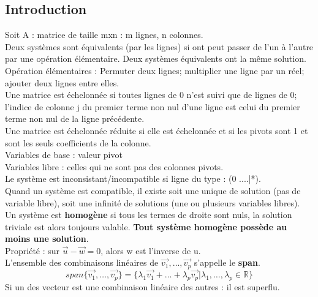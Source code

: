 \documentclass[../main.tex]{subfiles}
\begin{document}
\localtableofcontents
\subsection{Introduction}

Soit A : matrice de taille mxn : m lignes, n colonnes.\\
Deux systèmes sont équivalents (par les lignes) si ont peut passer de l'un à l'autre par une opération élémentaire. Deux systèmes équivalents ont la même solution. \\
Opération élémentaires : Permuter deux lignes; multiplier une ligne par un réel; ajouter deux lignes entre elles.\\
Une matrice est échelonnée si toutes lignes de 0 n'est suivi que de lignes de 0; l'indice de colonne j du premier terme non nul d'une ligne est celui du premier terme non nul de la ligne précédente.\\
Une matrice est échelonnée réduite si elle est échelonnée et si les pivots sont 1 et sont les seuls coefficients de la colonne.\\
Variables de base : valeur pivot\\
Variables libre : celles qui ne sont pas des colonnes pivots. \\
Le système est inconsistant/incompatible si ligne du type : (0 ....|*). \\Quand un système est compatible, il existe soit une unique de solution (pas de variable libre), soit une infinité de solutions (une ou plusieurs variables libres). \\
Un système est \textbf{homogène} si tous les termes de droite sont nuls, la solution triviale est alors toujours valable. \textbf{Tout système homogène possède au moins une solution}.\\

Propriété : sur $\vec{u} - \vec{w} = 0$, alors w est l'inverse de u.\\
L'ensemble des combinaisons linéaires de $\vec{v_1}, \dots, \vec{v_p}$ s'appelle le \textbf{span}.\\
\begin{equation}
    span\{\vec{v_1}, \dots, \vec{v_p}\}= \{\lambda_1 \vec{v_1}+ \dots+ \lambda_p \vec{v_p}|\lambda_1, \dots, \lambda_p \in \mathbb{R}\}
\end{equation}
Si un des vecteur est une combinaison linéaire des autres : il est superflu.\\
\end{document}
